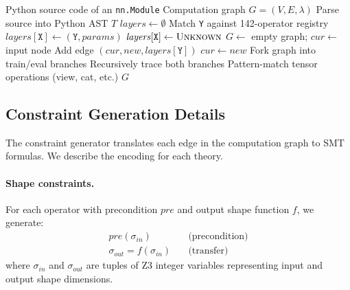 \documentclass[10pt]{article}
\theoremstyle{plain}
\theoremstyle{definition}
\theoremstyle{remark}
\begin{document}
\begin{algorithm}[t]
\caption{AST-based graph extraction}
\label{alg:extract}
\begin{algorithmic}[1]
\Require Python source code of an \texttt{nn.Module}
\Ensure Computation graph $G = (V, E, \lambda)$
\State Parse source into Python AST $T$
\State {}
\State $\mathit{layers} \gets \emptyset$
  \State Match \texttt{Y} against 142-operator registry
    \State $\mathit{layers}[\texttt{X}] \gets (\texttt{Y}, \mathit{params})$
  \Else
    \State $\mathit{layers}[\texttt{X}] \gets \textsc{Unknown}$
  \EndIf
\EndFor
\State {}
\State $G \gets$ empty graph; $\mathit{cur} \gets$ input node
    \State Add edge $(\mathit{cur}, \mathit{new}, \mathit{layers}[\texttt{Y}])$
    \State $\mathit{cur} \gets \mathit{new}$
    \State Fork graph into train/eval branches
    \State Recursively trace both branches
  \Else
    \State Pattern-match tensor operations (view, cat, etc.)
  \EndIf
\EndFor
\Return $G$
\end{algorithmic}
\end{algorithm}

\subsection{Constraint Generation Details}

The constraint generator translates each edge in the computation
graph to SMT formulas.  We describe the encoding for each theory.

\paragraph{Shape constraints.}
For each operator with precondition $\mathit{pre}$ and output shape
function $f$, we generate:
\begin{align*}
  \mathit{pre}(\sigma_{\mathit{in}}) &\quad\text{(precondition)} \\
  \sigma_{\mathit{out}} = f(\sigma_{\mathit{in}}) &\quad\text{(transfer)}
\end{align*}
where $\sigma_{\mathit{in}}$ and $\sigma_{\mathit{out}}$ are tuples
of Z3 integer variables representing input and output shape dimensions.
\end{document}
